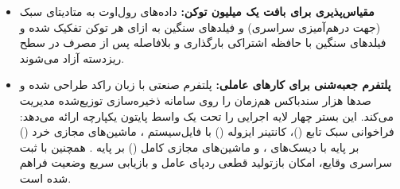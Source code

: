 \begin{itemize}
    \item \textbf{مقیاس‌پذیری  برای بافت یک میلیون توکن:} داده‌های رول‌اوت به متادیتای سبک (جهت درهم‌آمیزی سراسری) و فیلدهای سنگین به ازای هر توکن تفکیک شده و فیلدهای سنگین با حافظه اشتراکی بارگذاری و بلافاصله پس از مصرف در سطح ریزدسته آزاد می‌شوند.
    \item \textbf{پلتفرم جعبه‌شنی  برای کارهای عاملی:} پلتفرم صنعتی  با زبان راکد  طراحی شده و صدها هزار سندباکس هم‌زمان را روی سامانه ذخیره‌سازی توزیع‌شده  \cite{deepseek20253fs} مدیریت می‌کند. این بستر چهار لایه اجرایی را تحت یک واسط پایتون یکپارچه ارائه می‌دهد: فراخوانی سبک تابع ()، کانتینر ایزوله () با فایل‌سیستم  \cite{gao2019erofs}، ماشین‌های مجازی خرد () بر پایه  \cite{agache2020firecracker} با دیسک‌های  \cite{li2020dadi}، و ماشین‌های مجازی کامل () بر پایه  \cite{bellard2005qemu}. همچنین با ثبت سراسری وقایع، امکان بازتولید قطعی ردپای عامل و بازیابی سریع وضعیت فراهم شده است.
\end{itemize}